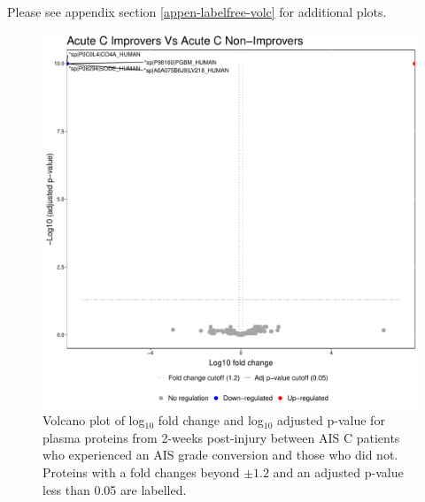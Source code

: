 \documentclass[9pt,lineno]{elife}
\begin{document}
Please see appendix section \ref{appen-labelfree-volc} for additional plots.

\clearpage



\begin{figure}
\includegraphics[width=1\linewidth]{figures/openms_protein_quantification/label_free/openms_volcano_plot_2021-08-10_0008} \caption{Volcano plot of log\(_10\) fold change and log\(_10\) adjusted p-value for plasma proteins from 2-weeks post-injury between AIS C patients who experienced an AIS grade conversion and those who did not. Proteins with a fold changes beyond \(\pm 1.2\) and an adjusted p-value less than 0.05 are labelled.}\label{fig:volc-plot-c-imp-vs-nonimp}
\end{figure}
\end{document}
